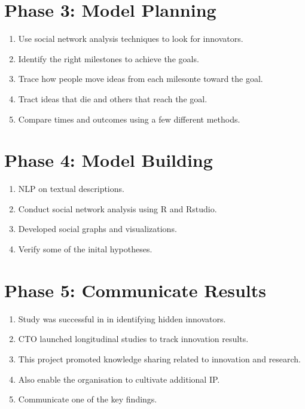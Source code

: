 \documentclass{article}
\begin{document}
\section{Phase 3: Model Planning}
\begin{enumerate}
    \item Use social network analysis techniques to look for innovators.
    \item Identify the right milestones to achieve the goals.
    \item Trace how people move ideas from each milesonte toward the goal.
    \item Tract ideas that die and others that reach the goal.
    \item Compare times and outcomes using a few different methods.
\end{enumerate}

\section{Phase 4: Model Building}
\begin{enumerate}
    \item NLP on textual descriptions.
    \item Conduct social network analysis using R and Rstudio.
    \item Developed social graphs and visualizations.
    \item Verify some of the inital hypotheses.
\end{enumerate}

\section{Phase 5: Communicate Results}
\begin{enumerate}
    \item Study was successful in in identifying hidden innovators.
    \item CTO launched longitudinal studies to track innovation results.
    \item This project promoted knowledge sharing related to innovation and research.
    \item Also enable the organisation to cultivate additional IP.
    \item Communicate one of the key findings.
\end{enumerate}
\end{document}
